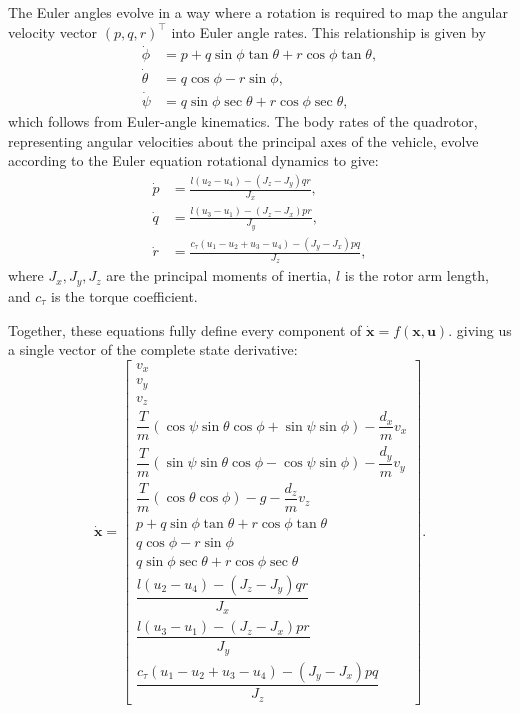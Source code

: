 \documentclass[11pt]{amsart}
\begin{document}
The Euler angles evolve in a way where a rotation is required to map the angular velocity vector 
$(p, q, r)^\top$ into Euler angle rates. This relationship is given by
\begin{align*}
\dot{\phi}   &= p + q\sin\phi\tan\theta + r\cos\phi\tan\theta, \\
\dot{\theta} &= q\cos\phi - r\sin\phi, \\
\dot{\psi}   &= q\sin\phi\sec\theta + r\cos\phi\sec\theta,
\end{align*}
which follows from Euler-angle kinematics. The body rates of the quadrotor, representing angular velocities about the principal axes of the vehicle, evolve according to the Euler equation rotational dynamics to give:
\begin{align*}
\dot{p} &= \frac{l(u_2 - u_4) - (J_z - J_y)qr}{J_x}, \\
\dot{q} &= \frac{l(u_3 - u_1) - (J_z - J_x)pr}{J_y}, \\
\dot{r} &= \frac{c_\tau(u_1 - u_2 + u_3 - u_4) - (J_y - J_x)pq}{J_z},
\end{align*}
where $J_x, J_y, J_z$ are the principal moments of inertia, $l$ is the rotor arm length, and $c_\tau$ is the torque coefficient.

Together, these equations fully define every component of $\dot{\mathbf{x}} = f(\mathbf{x}, \mathbf{u})$. 
giving us a single vector of the complete state derivative:
\[
\dot{\mathbf{x}} = \begin{bmatrix}
v_x \\
v_y \\
v_z \\
\dfrac{T}{m}(\cos\psi\sin\theta\cos\phi + \sin\psi\sin\phi) - \dfrac{d_x}{m}v_x \\[6pt]
\dfrac{T}{m}(\sin\psi\sin\theta\cos\phi - \cos\psi\sin\phi) - \dfrac{d_y}{m}v_y \\[6pt]
\dfrac{T}{m}(\cos\theta\cos\phi) - g - \dfrac{d_z}{m}v_z \\[6pt]
p + q\sin\phi\tan\theta + r\cos\phi\tan\theta \\
q\cos\phi - r\sin\phi \\
q\sin\phi\sec\theta + r\cos\phi\sec\theta \\[4pt]
\dfrac{l(u_2 - u_4) - (J_z - J_y)qr}{J_x} \\[8pt]
\dfrac{l(u_3 - u_1) - (J_z - J_x)pr}{J_y} \\[8pt]
\dfrac{c_\tau(u_1 - u_2 + u_3 - u_4) - (J_y - J_x)pq}{J_z}
\end{bmatrix}.
\]
\end{document}

